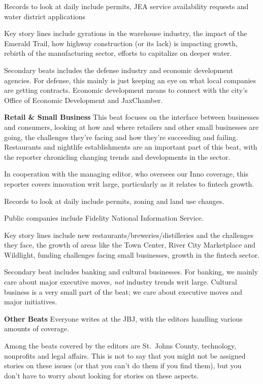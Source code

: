 \documentclass[
  11pt,
  american,
  letterpaperpaper,
  extrafontsizes,onecolumn,openright
  ]{memoir}
\newlength{\rf}
\begin{document}
Records to look at daily include permits, JEA service availability requests and water district applications

Key story lines include gyrations in the warehouse industry, the impact of the Emerald Trail, how highway construction (or its lack) is impacting growth, rebirth of the manufacturing sector, efforts to capitalize on deeper water.

Secondary beats includes the defense industry and economic development agencies. For defense, this mainly is just keeping an eye on what local companies are getting contracts. Economic development means to connect with the city's Office of Economic Development and JaxChamber.

\textbf{Retail \& Small Business}
This beat focuses on the interface between businesses and consumers, looking at how and where retailers and other small businesses are going, the challenges they're facing and how they're succeeding and failing. Restaurants and nightlife establishments are an important part of this beat, with the reporter chronicling changing trends and developments in the sector.

In cooperation with the managing editor, who oversees our Inno coverage, this reporter covers innovation writ large, particularly as it relates to fintech growth.

Records to look at daily include permits, zoning and land use changes.

Public companies include Fidelity National Information Service.

Key story lines include new restaurants/breweries/distilleries and the challenges they face, the growth of areas like the Town Center, River City Marketplace and Wildlight, funding challenges facing small businesses, growth in the fintech sector.

Secondary beat includes banking and cultural businesses. For banking, we mainly care about major executive moves, \emph{not} industry trends writ large. Cultural business is a very small part of the beat; we care about executive moves and major initiatives.

\textbf{Other Beats}
Everyone writes at the JBJ, with the editors handling various amounts of coverage.

Among the beats covered by the editors are St.~Johns County, technology, nonprofits and legal affairs. This is not to say that you might not be assigned stories on these issues (or that you can't do them if you find them), but you don't have to worry about looking for stories on these aspects.
\end{document}
